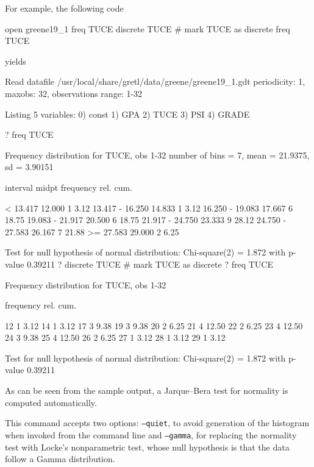 For example, the following code
\begin{code}
open greene19_1
freq TUCE
discrete TUCE # mark TUCE as discrete
freq TUCE
\end{code}
yields
\begin{code}
Read datafile /usr/local/share/gretl/data/greene/greene19_1.gdt
periodicity: 1, maxobs: 32,
observations range: 1-32

Listing 5 variables:
  0) const    1) GPA      2) TUCE     3) PSI      4) GRADE  

? freq TUCE

Frequency distribution for TUCE, obs 1-32
number of bins = 7, mean = 21.9375, sd = 3.90151

       interval          midpt   frequency    rel.     cum.

          <  13.417     12.000        1      3.12%
    13.417 - 16.250     14.833        1      3.12%
    16.250 - 19.083     17.667        6     18.75%
    19.083 - 21.917     20.500        6     18.75%
    21.917 - 24.750     23.333        9     28.12%
    24.750 - 27.583     26.167        7     21.88%
          >= 27.583     29.000        2      6.25%

Test for null hypothesis of normal distribution:
Chi-square(2) = 1.872 with p-value 0.39211
? discrete TUCE # mark TUCE as discrete
? freq TUCE

Frequency distribution for TUCE, obs 1-32

          frequency    rel.     cum.

  12           1      3.12%
  14           1      3.12%
  17           3      9.38%
  19           3      9.38%
  20           2      6.25%
  21           4     12.50%
  22           2      6.25%
  23           4     12.50%
  24           3      9.38%
  25           4     12.50%
  26           2      6.25%
  27           1      3.12%
  28           1      3.12%
  29           1      3.12%

Test for null hypothesis of normal distribution:
Chi-square(2) = 1.872 with p-value 0.39211
\end{code}
As can be seen from the sample output, a Jarque--Bera test for
normality is computed automatically.

This command accepts two options: \texttt{--quiet}, to avoid
generation of the histogram when invoked from the command line and
\texttt{--gamma}, for replacing the normality test with Locke's
nonparametric test, whose null hypothesis is that the data follow a
Gamma distribution.

